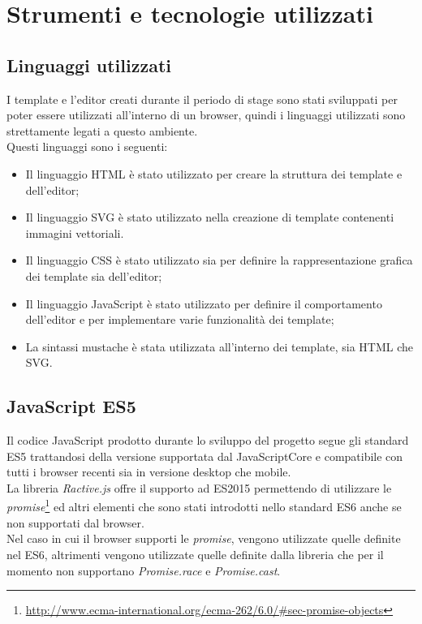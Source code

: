 
\chapter{Strumenti e tecnologie utilizzati}
\label{cap:strumenti-tecnologie}
\section{Linguaggi utilizzati}
I template e l'editor creati durante il periodo di stage sono stati sviluppati per poter essere utilizzati all'interno di un browser, quindi i linguaggi utilizzati sono strettamente legati a questo ambiente.\\
Questi linguaggi sono i seguenti:
\begin{itemize}
	\item Il linguaggio HTML è stato utilizzato per creare la struttura dei template e dell'editor;
	\item Il linguaggio SVG è stato utilizzato nella creazione di template contenenti immagini vettoriali.
	\item Il linguaggio CSS è stato utilizzato sia per definire la rappresentazione grafica dei template sia dell'editor;
	\item Il linguaggio JavaScript è stato utilizzato per definire il comportamento dell'editor e per implementare varie funzionalità dei template;
	\item La sintassi mustache è stata utilizzata all'interno dei template, sia  HTML che SVG. 
\end{itemize}

\section{JavaScript ES5}
Il codice JavaScript prodotto durante lo sviluppo del progetto segue gli standard ES5 trattandosi della versione supportata dal JavaScriptCore e compatibile con tutti i browser recenti sia in versione desktop che mobile.\\
La libreria \textit{Ractive.js} offre il supporto ad ES2015 permettendo di utilizzare le \textit{promise}\footnote{\url{http://www.ecma-international.org/ecma-262/6.0/\#sec-promise-objects}} ed altri elementi che sono stati introdotti nello standard ES6 anche se non supportati dal browser.\\
Nel caso in cui il browser supporti le \textit{promise}, vengono utilizzate quelle definite nel ES6, altrimenti vengono utilizzate quelle definite dalla libreria che per il momento non supportano \textit{Promise.race} e \textit{Promise.cast}.

